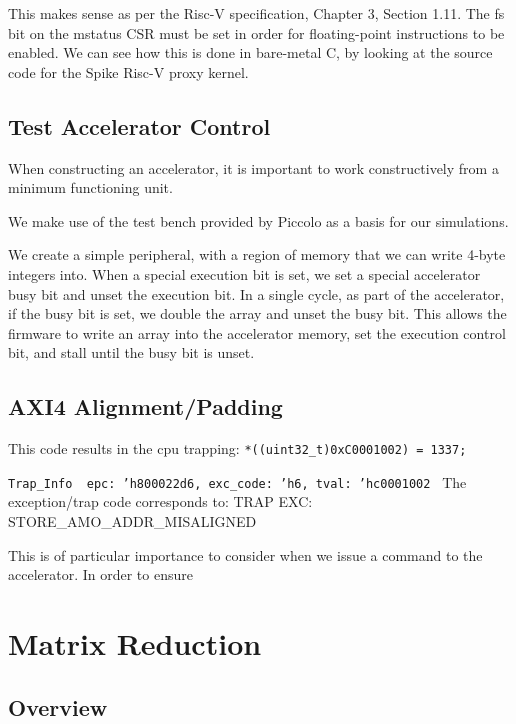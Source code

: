\documentclass[a4paper,9pt]{report}
\begin{document}
This makes sense as per the Risc-V specification, Chapter 3, Section 1.11.
The fs bit on the mstatus CSR must be set in order for floating-point
instructions to be enabled. We can see how this is done in bare-metal C, by
looking at the source code for the Spike Risc-V proxy kernel.


\subsection{Test Accelerator Control}
When constructing an accelerator, it is important to work constructively from a minimum
functioning unit.

We make use of the test bench provided by Piccolo as a basis for our
simulations.

We create a simple peripheral, with a region of memory that we can write 4-byte
integers into. When a special execution bit is set, we set a special accelerator
busy bit and unset the execution bit. In a single cycle, as part of the
accelerator, if the busy bit is set, we double the array and unset the busy bit.
This allows the firmware to write an array into the accelerator memory, set the
execution control bit, and stall until the busy bit is unset.



\subsection{AXI4 Alignment/Padding}

This code results in the cpu trapping:
\texttt{*((uint32\_t\*)0xC0001002) = 1337;}

\texttt{Trap\_Info { epc: 'h800022d6, exc\_code: 'h6, tval: 'hc0001002 }}
The exception/trap code corresponds to:
TRAP EXC: STORE\_AMO\_ADDR\_MISALIGNED

This is of particular importance to consider when we issue a command to the
accelerator. In order to ensure 

\section{Matrix Reduction}
\subsection{Overview}
\end{document}
